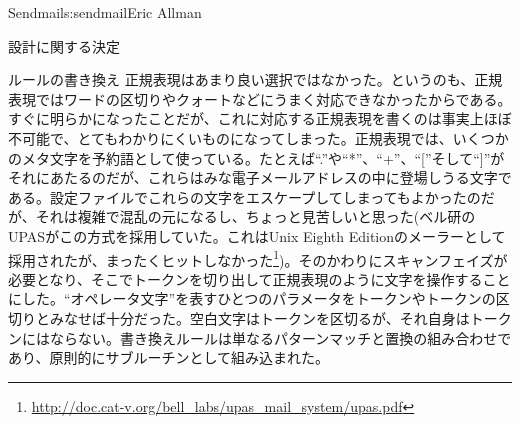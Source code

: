 \begin{aosachapter}{Sendmail}{s:sendmail}{Eric Allman}
\begin{aosasect1}{設計に関する決定}
\begin{aosasect2}{ルールの書き換え}
正規表現はあまり良い選択ではなかった。というのも、正規表現ではワードの区切りやクォートなどにうまく対応できなかったからである。すぐに明らかになったことだが、これに対応する正規表現を書くのは事実上ほぼ不可能で、とてもわかりにくいものになってしまった。正規表現では、いくつかのメタ文字を予約語として使っている。たとえば``.''や``*''、``+''、``{[}''そして``{]}''がそれにあたるのだが、これらはみな電子メールアドレスの中に登場しうる文字である。設定ファイルでこれらの文字をエスケープしてしまってもよかったのだが、それは複雑で混乱の元になるし、ちょっと見苦しいと思った(ベル研のUPASがこの方式を採用していた。これはUnix Eighth Editionのメーラーとして採用されたが、まったくヒットしなかった\footnote{\url{http://doc.cat-v.org/bell_labs/upas_mail_system/upas.pdf}})。そのかわりにスキャンフェイズが必要となり、そこでトークンを切り出して正規表現のように文字を操作することにした。``オペレータ文字''を表すひとつのパラメータをトークンやトークンの区切りとみなせば十分だった。空白文字はトークンを区切るが、それ自身はトークンにはならない。書き換えルールは単なるパターンマッチと置換の組み合わせであり、原則的にサブルーチンとして組み込まれた。


\end{aosasect2}
\end{aosasect1}
\end{aosachapter}
